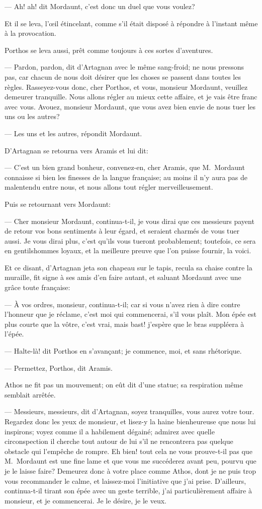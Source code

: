 — Ah! ah! dit Mordaunt, c'est donc un duel que vous voulez?

Et il se leva, l'œil étincelant, comme s'il était disposé à répondre à l'instant même à la provocation.

Porthos se leva aussi, prêt comme toujours à ces sortes d'aventures.

— Pardon, pardon, dit d'Artagnan avec le même sang-froid; ne nous pressons pas, car chacun de nous doit désirer que les choses se passent dans toutes les règles. Rasseyez-vous donc, cher Porthos, et vous, monsieur Mordaunt, veuillez demeurer tranquille. Nous allons régler au mieux cette affaire, et je vais être franc avec vous. Avouez, monsieur Mordaunt, que vous avez bien envie de nous tuer les uns ou les autres?

— Les uns et les autres, répondit Mordaunt.

D'Artagnan se retourna vers Aramis et lui dit:

— C'est un bien grand bonheur, convenez-en, cher Aramis, que M.~Mordaunt connaisse si bien les finesses de la langue française; au moins il n'y aura pas de malentendu entre nous, et nous allons tout régler merveilleusement.

Puis se retournant vers Mordaunt:

— Cher monsieur Mordaunt, continua-t-il, je vous dirai que ces messieurs payent de retour vos bons sentiments à leur égard, et seraient charmés de vous tuer aussi. Je vous dirai plus, c'est qu'ils vous tueront probablement; toutefois, ce sera en gentilshommes loyaux, et la meilleure preuve que l'on puisse fournir, la voici.

Et ce disant, d'Artagnan jeta son chapeau sur le tapis, recula sa chaise contre la muraille, fit signe à ses amis d'en faire autant, et saluant Mordaunt avec une grâce toute française:

— À vos ordres, monsieur, continua-t-il; car si vous n'avez rien à dire contre l'honneur que je réclame, c'est moi qui commencerai, s'il vous plaît. Mon épée est plus courte que la vôtre, c'est vrai, mais bast! j'espère que le bras suppléera à l'épée.

— Halte-là! dit Porthos en s'avançant; je commence, moi, et sans rhétorique.

— Permettez, Porthos, dit Aramis.

Athos ne fit pas un mouvement; on eût dit d'une statue; sa respiration même semblait arrêtée.

— Messieurs, messieurs, dit d'Artagnan, soyez tranquilles, vous aurez votre tour. Regardez donc les yeux de monsieur, et lisez-y la haine bienheureuse que nous lui inspirons; voyez comme il a habilement dégainé; admirez avec quelle circonspection il cherche tout autour de lui s'il ne rencontrera pas quelque obstacle qui l'empêche de rompre. Eh bien! tout cela ne vous prouve-t-il pas que M.~Mordaunt est une fine lame et que vous me succéderez avant peu, pourvu que je le laisse faire? Demeurez donc à votre place comme Athos, dont je ne puis trop vous recommander le calme, et laissez-moi l'initiative que j'ai prise. D'ailleurs, continua-t-il tirant son épée avec un geste terrible, j'ai particulièrement affaire à monsieur, et je commencerai. Je le désire, je le veux.



